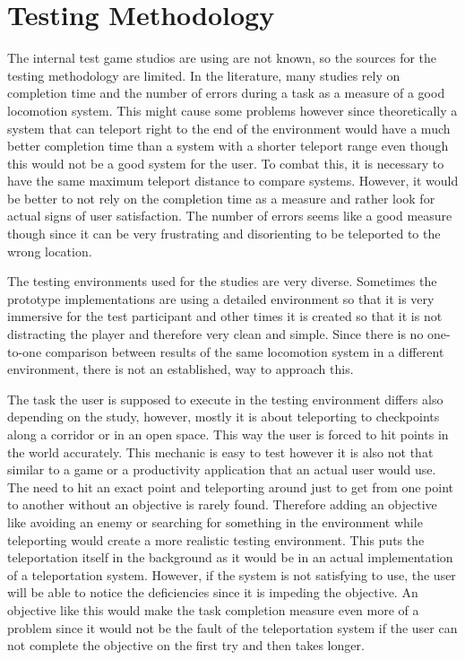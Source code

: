 \section{Testing Methodology}
The internal test game studios are using are not known, so the sources for the testing methodology are limited. In the literature, many studies rely on completion time and the number of errors during a task as a measure of a good locomotion system. %
This might cause some problems however since theoretically a system that can teleport right to the end of the environment would have a much better completion time than a system with a shorter teleport range even though this would not be a good system for the user. To combat this, it is necessary to have the same maximum teleport distance to compare systems. However, it would be better to not rely on the completion time as a measure and rather look for actual signs of user satisfaction. The number of errors seems like a good measure though since it can be very frustrating and disorienting to be teleported to the wrong location. 

The testing environments used for the studies are very diverse. Sometimes the prototype implementations are using a detailed environment so that it is very immersive for the test participant and other times it is created so that it is not distracting the player and therefore very clean and simple. %
Since there is no one-to-one comparison between results of the same locomotion system in a different environment, there is not an established, way to approach this.

The task the user is supposed to execute in the testing environment differs also depending on the study, however, mostly it is about teleporting to checkpoints along a corridor or in an open space. %
This way the user is forced to hit points in the world accurately. This mechanic is easy to test however it is also not that similar to a game or a productivity application that an actual user would use. The need to hit an exact point and teleporting around just to get from one point to another without an objective is rarely found. Therefore adding an objective like avoiding an enemy or searching for something in the environment while teleporting would create a more realistic testing environment. This puts the teleportation itself in the background as it would be in an actual implementation of a teleportation system. However, if the system is not satisfying to use, the user will be able to notice the deficiencies since it is impeding the objective. An objective like this would make the task completion measure even more of a problem since it would not be the fault of the teleportation system if the user can not complete the objective on the first try and then takes longer. 

